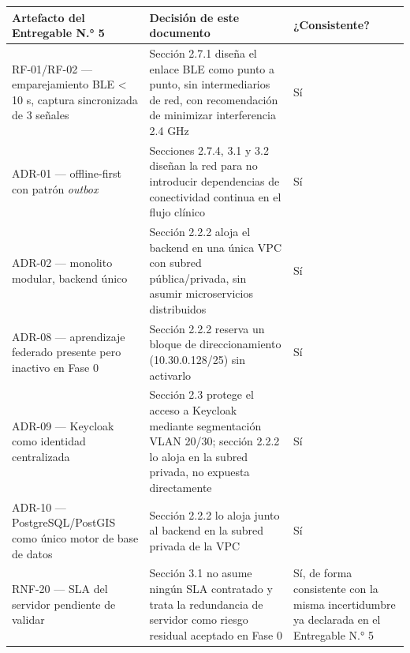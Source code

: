 \documentclass[11pt,a4paper]{article}
\begin{document}
{\small
\begin{longtable}[]{@{}
  >{\raggedright\arraybackslash}p{}
  >{\raggedright\arraybackslash}p{}
  >{\raggedright\arraybackslash}p{}@{}}
\toprule\noalign{}
\begin{minipage}[b]{\linewidth}\raggedright
Artefacto del Entregable N.° 5
\end{minipage} & \begin{minipage}[b]{\linewidth}\raggedright
Decisión de este documento
\end{minipage} & \begin{minipage}[b]{\linewidth}\raggedright
¿Consistente?
\end{minipage} \\
\midrule\noalign{}
\endhead
\bottomrule\noalign{}
\endlastfoot
RF-01/RF-02 --- emparejamiento BLE \textless{} 10 s, captura sincronizada de 3 señales & Sección 2.7.1 diseña el enlace BLE como punto a punto, sin intermediarios de red, con recomendación de minimizar interferencia 2.4 GHz & Sí \\
ADR-01 --- offline-first con patrón \emph{outbox} & Secciones 2.7.4, 3.1 y 3.2 diseñan la red para no introducir dependencias de conectividad continua en el flujo clínico & Sí \\
ADR-02 --- monolito modular, backend único & Sección 2.2.2 aloja el backend en una única VPC con subred pública/privada, sin asumir microservicios distribuidos & Sí \\
ADR-08 --- aprendizaje federado presente pero inactivo en Fase 0 & Sección 2.2.2 reserva un bloque de direccionamiento (10.30.0.128/25) sin activarlo & Sí \\
ADR-09 --- Keycloak como identidad centralizada & Sección 2.3 protege el acceso a Keycloak mediante segmentación VLAN 20/30; sección 2.2.2 lo aloja en la subred privada, no expuesta directamente & Sí \\
ADR-10 --- PostgreSQL/PostGIS como único motor de base de datos & Sección 2.2.2 lo aloja junto al backend en la subred privada de la VPC & Sí \\
RNF-20 --- SLA del servidor pendiente de validar & Sección 3.1 no asume ningún SLA contratado y trata la redundancia de servidor como riesgo residual aceptado en Fase 0 & Sí, de forma consistente con la misma incertidumbre ya declarada en el Entregable N.° 5 \\
\end{longtable}
}
\end{document}
